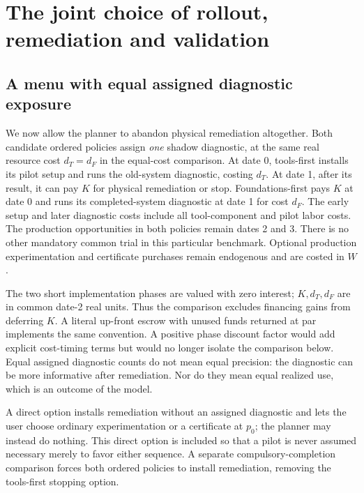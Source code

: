 \section{The joint choice of rollout, remediation and validation}\label{sec:planner}
\subsection{A menu with equal assigned diagnostic exposure}
We now allow the planner to abandon physical remediation altogether. Both candidate ordered policies assign \emph{one} shadow diagnostic, at the same real resource cost $d_T=d_F$ in the equal-cost comparison. At date 0, tools-first installs its pilot setup and runs the old-system diagnostic, costing $d_T$. At date 1, after its result, it can pay $K$ for physical remediation or stop. Foundations-first pays $K$ at date 0 and runs its completed-system diagnostic at date 1 for cost $d_F$. The early setup and later diagnostic costs include all tool-component and pilot labor costs. The production opportunities in both policies remain dates 2 and 3. There is no other mandatory common trial in this particular benchmark. Optional production experimentation and certificate purchases remain endogenous and are costed in $W$.

The two short implementation phases are valued with zero interest; $K,d_T,d_F$ are in common date-2 real units. Thus the comparison excludes financing gains from deferring $K$. A literal up-front escrow with unused funds returned at par implements the same convention. A positive phase discount factor would add explicit cost-timing terms but would no longer isolate the comparison below. Equal assigned diagnostic counts do not mean equal precision: the diagnostic can be more informative after remediation. Nor do they mean equal realized use, which is an outcome of the model.

A direct option installs remediation without an assigned diagnostic and lets the user choose ordinary experimentation or a certificate at $p_0$; the planner may instead do nothing. This direct option is included so that a pilot is never assumed necessary merely to favor either sequence. A separate compulsory-completion comparison forces both ordered policies to install remediation, removing the tools-first stopping option.

